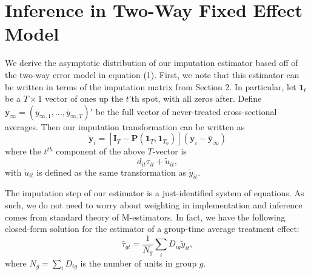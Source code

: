 \documentclass[12pt]{article}
\begin{document}
\section{Inference in Two-Way Fixed Effect Model}\label{sec:twfe_inference}

We derive the asymptotic distribution of our imputation estimator based off of the two-way error model in equation (1). First, we note that this estimator can be written in terms of the imputation matrix from Section 2. In particular, let $\bm 1_t$ be a $T \times 1$ vector of ones up the $t$'th spot, with all zeros after. Define $\overline{\bm y}_{\infty} = (\overline{y}_{\infty, 1},..., \overline{y}_{\infty, T})'$ be the full vector of never-treated cross-sectional averages. Then our imputation transformation can be written as 
\begin{equation}
    \tilde{\bm y}_i = \left[ \bm I_T - \bm P(\bm 1_T, \bm 1_{T_0}) \right] (\bm y_i - \overline{\bm y}_{\infty})
\end{equation}
where the $t^{th}$ component of the above $T$-vector is 
\begin{equation}
    d_{it} \tau_{it} + \tilde{u}_{it},
\end{equation}
with $\tilde{u}_{it}$ is defined as the same transformation as $\tilde{y}_{it}$.

The imputation step of our estimator is a just-identified system of equations. As such, we do not need to worry about weighting in implementation and inference comes from standard theory of M-estimators. In fact, we have the following closed-form solution for the estimator of a group-time average treatment effect: 
\begin{equation}
    \widehat{\tau}_{gt} = \frac{1}{N_{g}}\sum_{i} D_{ig} \tilde{y}_{it},
\end{equation}
where $N_{g} = \sum_i D_{ig}$ is the number of units in group $g$. 
\end{document}
